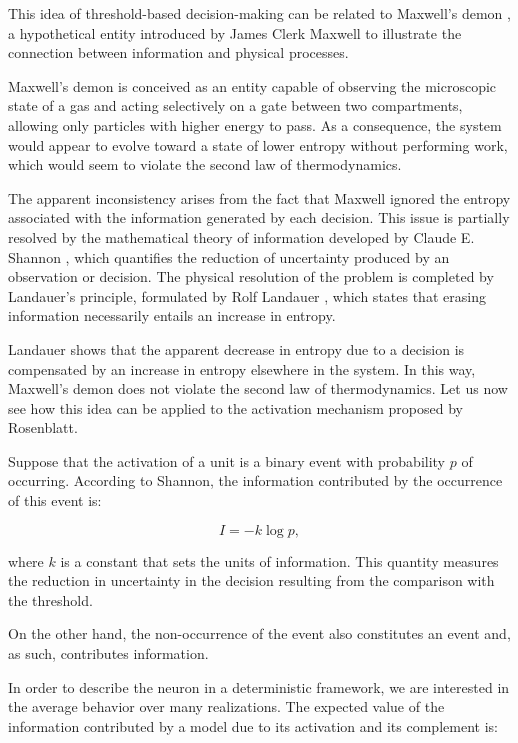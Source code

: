 \documentclass[12pt]{article}
\begin{document}
This idea of threshold-based decision-making can be related to Maxwell’s demon \cite{maxwell1871theory}, a hypothetical entity introduced by James Clerk Maxwell to illustrate the connection between information and physical processes.

Maxwell’s demon is conceived as an entity capable of observing the microscopic state of a gas and acting selectively on a gate between two compartments, allowing only particles with higher energy to pass. As a consequence, the system would appear to evolve toward a state of lower entropy without performing work, which would seem to violate the second law of thermodynamics.

The apparent inconsistency arises from the fact that Maxwell ignored the entropy associated with the information generated by each decision. This issue is partially resolved by the mathematical theory of information developed by Claude E. Shannon \cite{shannon1948mathematical}, which quantifies the reduction of uncertainty produced by an observation or decision. The physical resolution of the problem is completed by Landauer’s principle, formulated by Rolf Landauer \cite{landauer1961irreversibility}, which states that erasing information necessarily entails an increase in entropy.

Landauer shows that the apparent decrease in entropy due to a decision is compensated by an increase in entropy elsewhere in the system. In this way, Maxwell’s demon does not violate the second law of thermodynamics. Let us now see how this idea can be applied to the activation mechanism proposed by Rosenblatt.

Suppose that the activation of a unit is a binary event with probability $p$ of occurring. According to Shannon, the information contributed by the occurrence of this event is:

\begin{equation}
I = -k \log p,
\end{equation}

where $k$ is a constant that sets the units of information. This quantity measures the reduction in uncertainty in the decision resulting from the comparison with the threshold.

On the other hand, the non-occurrence of the event also constitutes an event and, as such, contributes information.

In order to describe the neuron in a deterministic framework, we are interested in the average behavior over many realizations. The expected value of the information contributed by a model due to its activation and its complement is:
\end{document}
